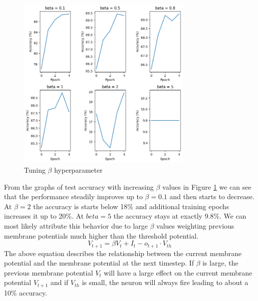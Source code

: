 \documentclass[12pt, letterpaper]{article}
\begin{document}
\begin{figure}[H]
    \centering
    \includegraphics[width=0.75\textwidth]{beta_tuning.png}
    \caption{Tuning $\beta$ hyperparameter}
    \label{fig:beta_tuning}
\end{figure}
From the graphs of test accuracy with increasing $\beta$ values in Figure \ref{fig:beta_tuning} we can see that the performance steadily improves up to $\beta = 0.1$ and then starts to decrease. At $\beta = 2$ the accuracy is starts below 18\% and additional training epochs increases it up to 20\%. At $beta = 5$ the accuracy stays at exactly 9.8\%. We can most likely attribute this behavior due to large $\beta$ values weighting previous membrane potentials much higher than the threshold potential. \[
    V_{t+1} = \beta V_t + I_t - o_{t+1} \cdot V_{th}
\]
The above equation describes the relationship between the current membrane potential and the membrane potential at the next timestep. If $\beta$ is large, the previous membrane potential $V_t$ will have a large effect on the current membrane potential $V_{t+1}$ and if $V_{th}$ is small, the neuron will always fire leading to about a 10\% accuracy.
\end{document}

